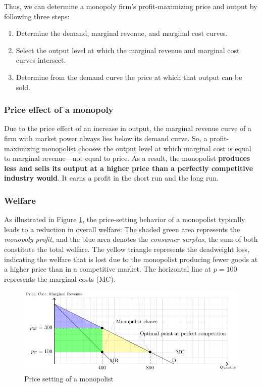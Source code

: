 \documentclass[
  12pt,
  oneside]{book}
\providecommand{\tightlist}{%
  \setlength{\itemsep}{0pt}\setlength{\parskip}{0pt}}
\theoremstyle{definition}
\theoremstyle{definition}
\theoremstyle{definition}
\theoremstyle{definition}
\theoremstyle{remark}
\begin{document}
Thus, we can determine a monopoly firm's profit-maximizing price and output by following three steps:

\begin{enumerate}
\def\labelenumi{\arabic{enumi}.}
\tightlist
\item
  Determine the demand, marginal revenue, and marginal cost curves.
\item
  Select the output level at which the marginal revenue and marginal cost curves intersect.
\item
  Determine from the demand curve the price at which that output can be sold.
\end{enumerate}

\subsubsection*{Price effect of a monopoly}\label{price-effect-of-a-monopoly}

Due to the price effect of an increase in output, the marginal revenue curve of a firm with market power always lies below its demand curve. So, a profit-maximizing monopolist chooses the output level at which marginal cost is equal to marginal revenue---not equal to price. As a result, the monopolist \textbf{produces less and sells its output at a higher price than a perfectly competitive industry would}. It earns a profit in the short run and the long run.

\subsubsection*{Welfare}\label{welfare}

As illustrated in Figure \ref{fig:mono2}, the price-setting behavior of a monopolist typically leads to a reduction in overall welfare: The shaded green area represents the \emph{monopoly profit}, and the blue area denotes the \emph{consumer surplus}, the sum of both constitute the total welfare. The yellow triangle represents the deadweight loss, indicating the welfare that is lost due to the monopolist producing fewer goods at a higher price than in a competitive market. The horizontal line at \(p=100\) represents the marginal costs (MC).

\begin{figure}
\centering
\includegraphics[width=1\textwidth,height=\textheight]{fig/monopoly.png}
\caption{\label{fig:mono2} Price setting of a monopolist}
\end{figure}
\end{document}
